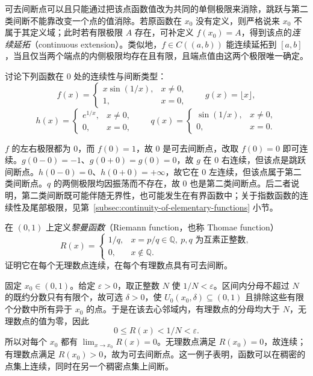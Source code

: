\documentclass[UTF8,12pt,a4paper,fontset=fandol]{ctexbook}
\begin{document}
可去间断点可以且只能通过把该点函数值改为共同的单侧极限来消除，跳跃与第二类间断不能靠改变一个点的值消除。若原函数在 $x_0$ 没有定义，则严格说来 $x_0$ 不属于其定义域；此时若有限极限 $A$ 存在，可补定义 $f(x_0)=A$，得到该点的\emph{连续延拓}（continuous extension）。类似地，$f\in C((a,b))$ 能连续延拓到 $[a,b]$，当且仅当两个端点的内侧极限均存在且有限，且端点值由这两个极限唯一确定。

\begin{example}
\label{ex:types-of-discontinuities}
讨论下列函数在 $0$ 处的连续性与间断类型：
\[
    f(x)=\begin{cases}x\sin(1/x),&x\neq0,\\1,&x=0,\end{cases}
    \qquad g(x)=\lfloor x\rfloor,
\]
\[
    h(x)=\begin{cases}e^{1/x},&x\neq0,\\0,&x=0,\end{cases}
    \qquad q(x)=\begin{cases}\sin(1/x),&x\neq0,\\0,&x=0.\end{cases}
\]
\end{example}

\begin{solve}
$f$ 的左右极限都为 $0$，而 $f(0)=1$，故 $0$ 是可去间断点，改取 $f(0)=0$ 即可连续。$g(0-0)=-1$、$g(0+0)=g(0)=0$，故 $g$ 在 $0$ 右连续，但该点是跳跃间断点。$h(0-0)=0$、$h(0+0)=+\infty$，故它在 $0$ 左连续，但该点属于第二类间断点。$q$ 的两侧极限均因振荡而不存在，故 $0$ 也是第二类间断点。后二者说明，第二类间断既可能伴随无界性，也可能发生在有界函数中；关于指数函数的连续性及尾部极限，见第~\ref{subsec:continuity-of-elementary-functions} 小节。
\end{solve}

\begin{example}
\label{ex:riemann-function-continuity}
在 $(0,1)$ 上定义\emph{黎曼函数}（Riemann function，也称 Thomae function）
\[
    R(x)=\begin{cases}
        1/q,&x=p/q\in\mathbb{Q},\ p,q\text{ 为互素正整数},\\
        0,&x\notin\mathbb{Q}.
    \end{cases}
\]
证明它在每个无理数点连续，在每个有理数点具有可去间断。
\end{example}

\begin{solve}
固定 $x_0\in(0,1)$。给定 $\varepsilon>0$，取正整数 $N$ 使 $1/N<\varepsilon$。区间内分母不超过 $N$ 的既约分数只有有限个，故可选 $\delta>0$，使 $U_0(x_0,\delta)\subseteq(0,1)$ 且排除这些有限个分数中所有异于 $x_0$ 的点。于是在该去心邻域内，有理数点的分母均大于 $N$，无理数点的值为零，因此
\[
    0\leq R(x)<1/N<\varepsilon.
\]
所以对每个 $x_0$ 都有 $\lim_{x\to x_0}R(x)=0$。无理数点满足 $R(x_0)=0$，故连续；有理数点满足 $R(x_0)>0$，故为可去间断点。这一例子表明，函数可以在稠密的点集上连续，同时在另一个稠密点集上间断。
\end{solve}
\end{document}
